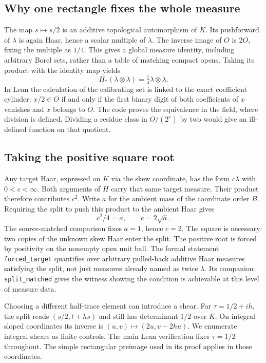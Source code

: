 \documentclass[12pt,letterpaper]{article}
\newcommand{\id}[1]{{\small\nolinkurl{#1}}}
\begin{document}
\subsection{Why one rectangle fixes the whole measure}
The map $s\mapsto s/2$ is an additive topological automorphism of $K$. Its pushforward of $\lambda$ is again Haar, hence a scalar multiple of $\lambda$. The inverse image of $O$ is $2O$, fixing the multiple as $1/4$. This gives a global measure identity, including arbitrary Borel sets, rather than a table of matching compact opens. Taking its product with the identity map yields
\[
 H_*(\lambda\otimes\lambda)=\tfrac14\lambda\otimes\lambda .
\]
In Lean the calculation of the calibrating set is linked to the exact coefficient cylinder: $x/2\in O$ if and only if the first binary digit of both coefficients of $x$ vanishes and $x$ belongs to $O$. The code proves the equivalence in the field, where division is defined. Dividing a residue class in $O/(2^r)$ by two would give an ill-defined function on that quotient.

\subsection{Taking the positive square root}
Any target Haar, expressed on $K$ via the skew coordinate, has the form $c\lambda$ with $0<c<\infty$. Both arguments of $H$ carry that same target measure. Their product therefore contributes $c^2$. Write $a$ for the ambient mass of the coordinate order $B$. Requiring the split to push this product to the ambient Haar gives
\[
          c^2/4=a,\qquad c=2\sqrt a .
\]
The source-matched comparison fixes $a=1$, hence $c=2$. The square is necessary: two copies of the unknown skew Haar enter the split. The positive root is forced by positivity on the nonempty open unit ball. The formal statement \id{forced_target} quantifies over arbitrary pulled-back additive Haar measures satisfying the split, not just measures already named as twice $\lambda$. Its companion \id{split_matched} gives the witness showing the condition is achievable at this level of measure data.

Choosing a different half-trace element can introduce a shear. For $\tau=1/2+i h$, the split reads $(s/2,t+hs)$ and still has determinant $1/2$ over $K$. On integral sloped coordinates its inverse is $(u,v)\mapsto(2u,v-2hu)$. We enumerate integral shears as finite controls. The main Lean verification fixes $\tau=1/2$ throughout. The simple rectangular preimage used in its proof applies in those coordinates.
\end{document}
